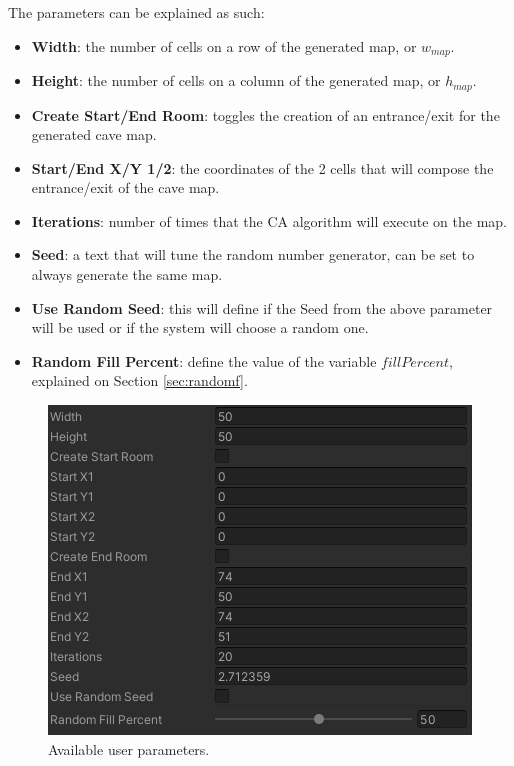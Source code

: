 The parameters can be explained as such:
\begin{itemize}
    \item \textbf{Width}: the number of cells on a row of the generated map, or \(w_{map}\).
    \item \textbf{Height}: the number of cells on a column of the generated map, or \(h_{map}\).
    \item \textbf{Create Start/End Room}: toggles the creation of an entrance/exit for the generated cave map.
    \item \textbf{Start/End X/Y 1/2}: the coordinates of the 2 cells that will compose the entrance/exit of the cave map.
    \item \textbf{Iterations}: number of times that the CA algorithm will execute on the map.
    \item \textbf{Seed}: a text that will tune the random number generator, can be set to always generate the same map.
    \item \textbf{Use Random Seed}: this will define if the Seed from the above parameter will be used or if the system will choose a random one.
    \item \textbf{Random Fill Percent}: define the value of the variable \(fillPercent\), explained on Section \ref{sec:randomf}. 
\end{itemize}

\begin{figure}[h]
    \caption{Available user parameters.}
    \centerline{\includegraphics{images/development/user_parameters.png}}
    \label{fig:user_par}
\end{figure}